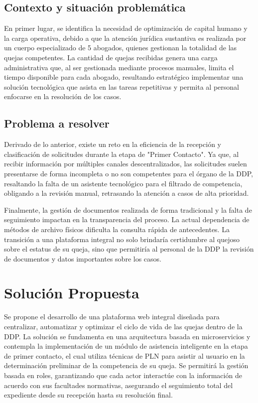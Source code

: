     \subsection{Contexto y situación problemática}
    
    En primer lugar, se identifica la necesidad de optimización de capital humano y la carga operativa, debido a que la atención jurídica sustantiva es realizada por un cuerpo especializado de 5 abogados, quienes gestionan la totalidad de las quejas competentes. La cantidad de quejas recibidas genera una carga administrativa que, al ser gestionada mediante procesos manuales, limita el tiempo disponible para cada abogado, resultando estratégico implementar una solución tecnológica que asista en las tareas repetitivas y permita al personal enfocarse en la resolución de los casos.
    
    \subsection{Problema a resolver}
    
    Derivado de lo anterior, existe un reto en la eficiencia de la recepción y clasificación de solicitudes durante la etapa de "Primer Contacto". Ya que, al recibir información por múltiples canales descentralizados, las solicitudes suelen presentarse de forma incompleta o no son competentes para el órgano de la DDP, resaltando la falta de un asistente tecnológico para el filtrado de competencia, obligando a la revisión manual, retrasando la atención a casos de alta prioridad.
    
    Finalmente, la gestión de documentos realizada de forma tradicional y la falta de seguimiento impactan en la transparencia del proceso. La actual dependencia de métodos de archivo físicos dificulta la consulta rápida de antecedentes. La transición a una plataforma integral no solo brindaría certidumbre al quejoso sobre el estatus de su queja, sino que permitiría al personal de la DDP la revisión de documentos y datos importantes sobre los casos.

\section{Solución Propuesta}

    Se propone el desarrollo de una plataforma web integral diseñada para centralizar, automatizar y optimizar el ciclo de vida de las quejas dentro de la DDP. La solución se fundamenta en una arquitectura basada en microservicios y contempla la implementación de un módulo de asistencia inteligente en la etapa de primer contacto, el cual utiliza técnicas de PLN para asistir al usuario en la determinación preliminar de la competencia de su queja. Se permitirá la gestión basada en roles, garantizando que cada actor interactúe con la información de acuerdo con sus facultades normativas, asegurando el seguimiento total del expediente desde su recepción hasta su resolución final.

